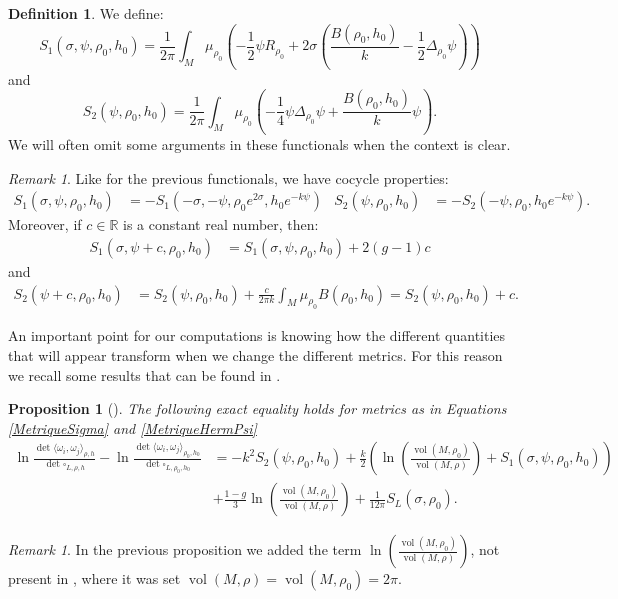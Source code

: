 \documentclass{article}
\newtheorem{Proposition}[theorem]{Proposition}
\theoremstyle{definition}
\newtheorem{Definition}[theorem]{Definition}
\theoremstyle{remark}
\newtheorem{Remark}[theorem]{Remark}
\DeclareMathOperator{\vol}{vol}
\begin{document}
\begin{Definition}\label{DefFonctionnelleS}
    We define: $$S_{1}(\sigma,\psi,\rho_{0},h_{0})=\frac{1}{2\pi}\int_{M}\mu_{\rho_{0}}\left(-\frac{1}{2}\psi R_{\rho_{0}} +2\sigma\left(\frac{B(\rho_{0},h_{0})}{k}-\frac{1}{2}\Delta_{\rho_{0}}\psi \right) \right)$$
    and $$S_{2}(\psi,\rho_{0},h_{0})=\frac{1}{2\pi}\int_{M}\mu_{\rho_{0}}\left(-\frac{1}{4}\psi\Delta_{\rho_{0}}\psi+\frac{B(\rho_{0},h_{0})}{k}\psi\right).$$
    We will often omit some arguments in these functionals when the context is clear.
\end{Definition}
\begin{Remark}
    Like for the previous functionals, we have cocycle properties: \begin{align*}
        S_{1}(\sigma,\psi,\rho_{0},h_{0})&=-S_{1}(-\sigma,-\psi,\rho_{0}e^{2\sigma},h_{0}e^{-k\psi}) & S_{2}(\psi,\rho_{0},h_{0})&=-S_{2}(-\psi,\rho_{0},h_{0}e^{-k\psi}).
    \end{align*}
    Moreover, if $c \in \mathbb{R}$ is a constant real number, then: \begin{align*}
        S_{1}(\sigma,\psi+c,\rho_{0},h_{0})&=S_{1}(\sigma,\psi,\rho_{0},h_{0})+2(g-1)c  
        \end{align*}
        and \begin{align*}S_{2}(\psi+c,\rho_{0},h_{0})&=S_{2}(\psi,\rho_{0},h_{0})+\frac{c}{2\pi k}\int_{M}\mu_{\rho_{0}}B(\rho_{0},h_{0})=S_{2}(\psi,\rho_{0},h_{0})+c.
    \end{align*}
\end{Remark}

An important point for our computations is knowing how the different quantities that will appear transform when we change the different metrics. For this reason we recall some results that can be found in \cite{KlevtsovQuillen}.

\begin{Proposition}[{\cite[Th. 4]{KlevtsovQuillen}}]\label{VarDetFi}
    The following exact equality holds for metrics as in Equations \eqref{MetriqueSigma} and \eqref{MetriqueHermPsi} \begin{align*}
    \ln\frac{\det\langle \omega_{i},\omega_{j}\rangle_{\rho,h}}{\det\square_{L,\rho,h}}-\ln\frac{\det\langle \omega_{i},\omega_{j}\rangle_{\rho_{0},h_{0}}}{\det\square_{L,\rho_{0},h_{0}}}&=-k^{2}S_{2}(\psi,\rho_{0},h_{0})+\frac{k}{2}\left(\ln \left(\frac{\vol(M,\rho_{0})}{\vol(M,\rho)} \right)+S_{1}(\sigma,\psi,\rho_{0},h_{0})  \right)\\& +\frac{1-g}{3}\ln \left(\frac{\vol(M,\rho_{0})}{\vol(M,\rho)} \right)+\frac{1}{12\pi}S_{L}(\sigma,\rho_{0}).
    \end{align*}
\end{Proposition}
\begin{Remark}In the previous proposition we added the term $\ln \left(\frac{\vol(M,\rho_{0})}{\vol(M,\rho)} \right)$, not present in \cite{KlevtsovQuillen}, where it was set $\vol(M,\rho)=\vol(M,\rho_{0})=2\pi$. 
\end{Remark}
\end{document}
